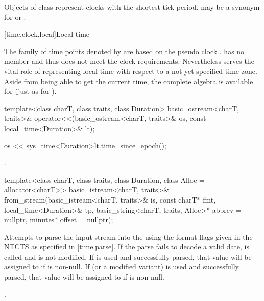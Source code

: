\pnum
Objects of class  represent clocks with the
shortest tick period.  may be a synonym for
 or .

[time.clock.local]{Local time}
%

\pnum
The family of time points
denoted by 
are based on the pseudo clock .
 has no member 
and thus does not meet the clock requirements.
Nevertheless  serves the vital role of
representing local time with respect to a not-yet-specified time zone.
Aside from being able to get the current time,
the complete  algebra is available
for  (just as for ).

%
\begin{itemdecl}
template<class charT, class traits, class Duration>
  basic_ostream<charT, traits>&
    operator<<(basic_ostream<charT, traits>& os, const local_time<Duration>& lt);
\end{itemdecl}

\begin{itemdescr}
\pnum
\effects
\begin{codeblock}
os << sys_time<Duration>{lt.time_since_epoch()};
\end{codeblock}

\pnum
\returns
{}.
\end{itemdescr}

%
\begin{itemdecl}
template<class charT, class traits, class Duration, class Alloc = allocator<charT>>
  basic_istream<charT, traits>&
    from_stream(basic_istream<charT, traits>& is, const charT* fmt,
                local_time<Duration>& tp, basic_string<charT, traits, Alloc>* abbrev = nullptr,
                minutes* offset = nullptr);
\end{itemdecl}

\begin{itemdescr}
\pnum
\effects
Attempts to parse the input stream 
into the   using
the format flags given in the NTCTS 
as specified in \ref{time.parse}.
If the parse fails to decode a valid date,
 is called and
 is not modified.
If  is used and successfully parsed,
that value will be assigned to  if  is non-null.
If  (or a modified variant) is used and successfully parsed,
that value will be assigned to  if  is non-null.

\pnum
\returns
{}.
\end{itemdescr}

